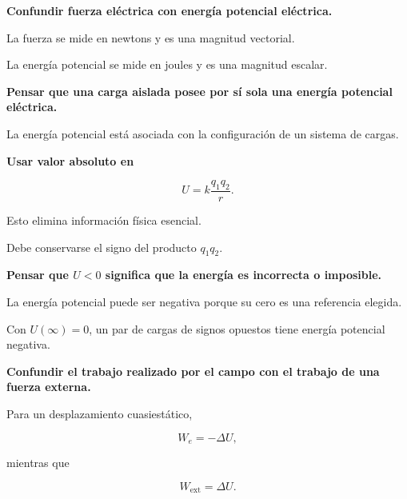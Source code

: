 \begin{errorfrecuente}

\textbf{Confundir fuerza eléctrica con energía potencial eléctrica.}

La fuerza se mide en newtons y es una magnitud vectorial.

La energía potencial se mide en joules y es una magnitud escalar.

\end{errorfrecuente}


\begin{errorfrecuente}

\textbf{Pensar que una carga aislada posee por sí sola una energía potencial eléctrica.}

La energía potencial está asociada con la configuración de un sistema de cargas.

\end{errorfrecuente}


\begin{errorfrecuente}

\textbf{Usar valor absoluto en}

\[
U=k\frac{q_1q_2}{r}.
\]

Esto elimina información física esencial.

Debe conservarse el signo del producto \(q_1q_2\).

\end{errorfrecuente}


\begin{errorfrecuente}

\textbf{Pensar que \(U<0\) significa que la energía es incorrecta o imposible.}

La energía potencial puede ser negativa porque su cero es una referencia elegida.

Con \(U(\infty)=0\), un par de cargas de signos opuestos tiene energía potencial
negativa.

\end{errorfrecuente}


\begin{errorfrecuente}

\textbf{Confundir el trabajo realizado por el campo con el trabajo de una fuerza
externa.}

Para un desplazamiento cuasiestático,

\[
W_e=-\Delta U,
\]

mientras que

\[
W_{\text{ext}}=\Delta U.
\]

\end{errorfrecuente}


